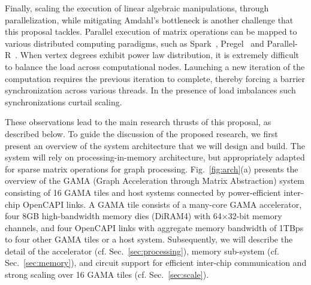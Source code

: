  
Finally, scaling the execution of linear algebraic manipulations, through parallelization, while mitigating Amdahl's bottleneck is another challenge that this proposal tackles. 
Parallel execution of matrix operations can be mapped to various distributed computing paradigms, such as Spark~\cite{zaharia2010spark, MapReduce}, Pregel~\cite{pregel, Giraph} and Parallel-R~\cite{kabacoff2015r}. 
When vertex degrees exhibit power law distribution, it is extremely difficult to balance the load across computational nodes. 
Launching a new iteration of the computation requires the previous iteration to complete, thereby forcing a barrier synchronization across various threads. 
In the presence of load imbalances such synchronizations curtail scaling. 


These observations lead to the main research thrusts of this proposal, as described below. 
To guide the discussion of the proposed research, we first present an overview of the system architecture that we will design and build. 
The system will rely on processing-in-memory architecture, but appropriately adapted for sparse matrix operations for graph processing. 
Fig.~\ref{fig:arch}(a) presents the overview of the GAMA (Graph Acceleration through Matrix Abstraction) system consisting of 16 GAMA tiles and host systems connected by power-efficient inter-chip OpenCAPI links.
A GAMA tile consists of a many-core GAMA accelerator, four 8GB high-bandwidth memory dies (DiRAM4) with 64$\times$32-bit memory channels, 
and four OpenCAPI links with aggregate memory bandwidth of 1TBps to four other GAMA tiles or a host system.
Subsequently, we will describe the detail of the accelerator (cf. Sec.~\ref{sec:processing}),  memory sub-system (cf. Sec.~\ref{sec:memory}), and circuit support for efficient inter-chip communication and strong scaling over 16 GAMA tiles (cf. Sec.~\ref{sec:scale}).


